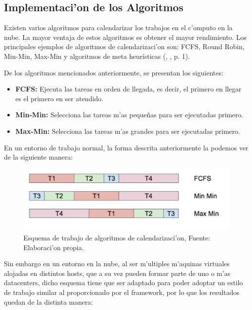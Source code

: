 \subsection{Implementaci'on de los Algoritmos}

Existen varios algoritmos para calendarizar los trabajos en el c'omputo en la nube. La mayor ventaja de estos algoritmos es obtener el mayor rendimiento. Los principales ejemplos de algoritmos de calendarizaci'on son: FCFS, Round Robin, Min-Min, Max-Min y algoritmos de meta heurísticas  (\citeauthor{shimpy2014different}, \citeyear{shimpy2014different}, p. 1).



De los algoritmos mencionados anteriormente, se presentan los siguientes:


\begin{itemize}
	\item  \textbf{FCFS:} Ejecuta las tareas en orden de llegada, es decir, el primero en llegar es el primero en ser atendido.
	\item  \textbf{Min-Min:} Selecciona las tareas m'as pequeñas para ser ejecutadas primero.
	\item  \textbf{Max-Min:} Selecciona las tareas m'as grandes para ser ejecutadas primero.
\end{itemize}

En un entorno de trabajo normal, la forma descrita anteriormente la podemos ver de la siguiente manera:

\begin{figure}
	\caption{Esquema de trabajo de algoritmos de calendarizaci'on, Fuente: Elaboraci'on propia.}
	\centering
	\includegraphics[scale=0.5]{media/imagendos}
\end{figure}


\newpage
Sin embargo en un entorno en la nube, al ser m'ultiples m'aquinas virtuales alojadas en distintos hosts, que a su vez pueden formar parte de uno o m'as datacenters, dicho esquema tiene que ser adaptado para poder adoptar un estilo de trabajo similar al proporcionado por el framework, por lo que los resultados quedan de la distinta manera:

